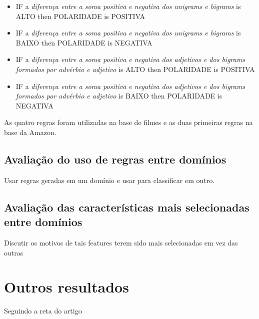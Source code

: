 \begin{itemize}
\item IF a \textit{diferença entre a soma positiva e negativa dos unigrams e bigrams} is ALTO then POLARIDADE is POSITIVA
\item IF a \textit{diferença entre a soma positiva e negativa dos unigrams e bigrams} is BAIXO then POLARIDADE is NEGATIVA
\item IF a \textit{diferença entre a soma positiva e negativa dos adjetivos e dos bigrams formados por advérbio e adjetivo} is ALTO then POLARIDADE is POSITIVA
\item IF a \textit{diferença entre a soma positiva e negativa dos adjetivos e dos bigrams formados por advérbio e adjetivo} is BAIXO then POLARIDADE is NEGATIVA
\end{itemize}

As quatro regras foram utilizadas na base de filmes e as duas primeiras regras na base da Amazon.

\subsection{Avaliação do uso de regras entre domínios}

Usar regras geradas em um domínio e usar para classificar em outro.

\subsection{Avaliação das características mais selecionadas entre domínios}

Discutir os motivos de tais features terem sido mais selecionadas em vez das outras

\section{Outros resultados}

Seguindo a reta do artigo

